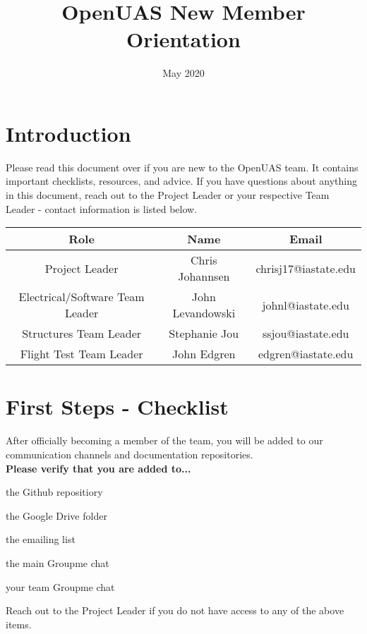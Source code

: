 \documentclass{article}
\title{OpenUAS New Member Orientation}
\author{}
\date{May 2020}
\begin{document}
\maketitle

\section{Introduction}
Please read this document over if you are new to the OpenUAS team. It contains important checklists, resources, and advice. If you have questions about anything in this document, reach out to the Project Leader or your respective Team Leader - contact information is listed below.

\begin{center}
\begin{tabular}{|c|c|c| }
\hline
\textbf{Role} & \textbf{Name} & \textbf{Email} \\
\hline
Project Leader & Chris Johannsen & chrisj17@iastate.edu \\ 
\hline
Electrical/Software Team Leader & John Levandowski & johnl@iastate.edu \\  
\hline
Structures Team Leader & Stephanie Jou & ssjou@iastate.edu \\
\hline
Flight Test Team Leader & John Edgren & edgren@iastate.edu \\
\hline
\end{tabular}
\end{center}


\section{First Steps - Checklist}
After officially becoming a member of the team, you will be added to our communication channels and documentation repositories.\\

\noindent \textbf{Please verify that you are added to...}

\begin{todolist}
	\item the Github repositiory
	\item the Google Drive folder
	\item the emailing list
	\item the main Groupme chat
	\item your team Groupme chat
\end{todolist}

\noindent Reach out to the Project Leader if you do not have access to any of the above items. 
\end{document}

